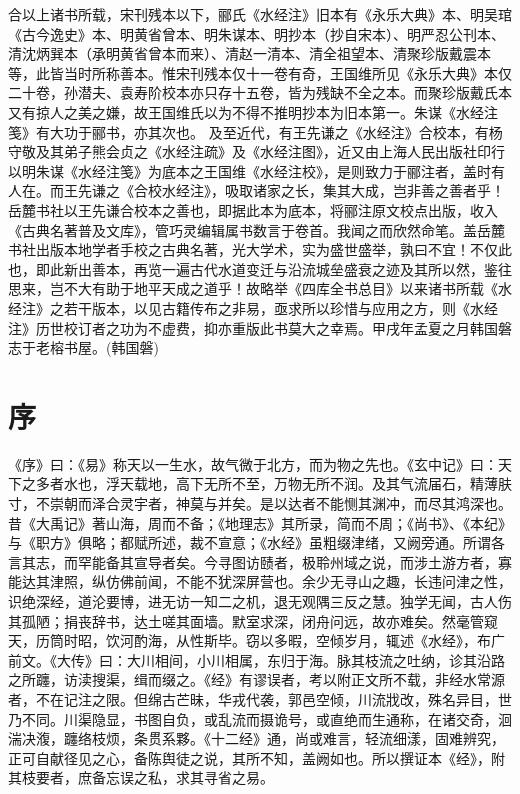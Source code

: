 \documentclass[12pt,UTF8]{ctexbook}
\begin{document}
合以上诸书所载，宋刊残本以下，郦氏《水经注》旧本有《永乐大典》本、明吴琯《古今逸史》本、明黄省曾本、明朱谋本、明抄本（抄自宋本）、明严忍公刊本、清沈炳巽本（承明黄省曾本而来）、清赵一清本、清全祖望本、清聚珍版戴震本等，此皆当时所称善本。惟宋刊残本仅十一卷有奇，王国维所见《永乐大典》本仅二十卷，孙潜夫、袁寿阶校本亦只存十五卷，皆为残缺不全之本。而聚珍版戴氏本又有掠人之美之嫌，故王国维氏以为不得不推明抄本为旧本第一。朱谋《水经注笺》有大功于郦书，亦其次也。
及至近代，有王先谦之《水经注》合校本，有杨守敬及其弟子熊会贞之《水经注疏》及《水经注图》，近又由上海人民出版社印行以明朱谋《水经注笺》为底本之王国维《水经注校》，是则致力于郦注者，盖时有人在。而王先谦之《合校水经注》，吸取诸家之长，集其大成，岂非善之善者乎！岳麓书社以王先谦合校本之善也，即据此本为底本，将郦注原文校点出版，收入《古典名著普及文库》，管巧灵编辑属书数言于卷首。我闻之而欣然命笔。盖岳麓书社出版本地学者手校之古典名著，光大学术，实为盛世盛举，孰曰不宜！不仅此也，即此新出善本，再览一遍古代水道变迁与沿流城垒盛衰之迹及其所以然，鉴往思来，岂不大有助于地平天成之道乎！故略举《四库全书总目》以来诸书所载《水经注》之若干版本，以见古籍传布之非易，亟求所以珍惜与应用之方，则《水经注》历世校订者之功为不虚费，抑亦重版此书莫大之幸焉。甲戌年孟夏之月韩国磐志于老榕书屋。(韩国磐)

\chapter{序}

《序》曰：《易》称天以一生水，故气微于北方，而为物之先也。《玄中记》曰：天下之多者水也，浮天载地，高下无所不至，万物无所不润。及其气流届石，精薄肤寸，不崇朝而泽合灵宇者，神莫与并矣。是以达者不能恻其渊冲，而尽其鸿深也。昔《大禹记》著山海，周而不备；《地理志》其所录，简而不周；《尚书》、《本纪》与《职方》俱略；都赋所述，裁不宣意；《水经》虽粗缀津绪，又阙旁通。所谓各言其志，而罕能备其宣导者矣。今寻图访赜者，极聆州域之说，而涉土游方者，寡能达其津照，纵仿佛前闻，不能不犹深屏营也。余少无寻山之趣，长违问津之性，识绝深经，道沦要博，进无访一知二之机，退无观隅三反之慧。独学无闻，古人伤其孤陋；捐丧辞书，达土嗟其面墙。默室求深，闭舟问远，故亦难矣。然毫管窥天，历筒时昭，饮河酌海，从性斯毕。窃以多暇，空倾岁月，辄述《水经》，布广前文。《大传》曰：大川相间，小川相属，东归于海。脉其枝流之吐纳，诊其沿路之所躔，访渎搜渠，缉而缀之。《经》有谬误者，考以附正文所不载，非经水常源者，不在记注之限。但绵古芒昧，华戎代袭，郭邑空倾，川流戕改，殊名异目，世乃不同。川渠隐显，书图自负，或乱流而摄诡号，或直绝而生通称，在诸交奇，洄湍决澓，躔络枝烦，条贯系夥。《十二经》通，尚或难言，轻流细漾，固难辨究，正可自献径见之心，备陈舆徒之说，其所不知，盖阙如也。所以撰证本《经》，附其枝要者，庶备忘误之私，求其寻省之易。
\end{document}
